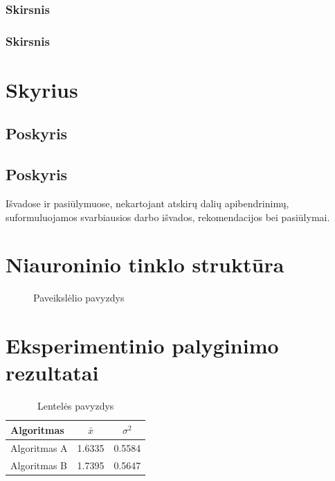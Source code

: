 \documentclass{VUMIFInfKursinis}
\begin{document}
\subsubsection{Skirsnis}
\subsubsection{Skirsnis}
\section{Skyrius}
\subsection{Poskyris}
\subsection{Poskyris}

Išvadose ir pasiūlymuose, nekartojant atskirų dalių apibendrinimų,
suformuluojamos svarbiausios darbo išvados, rekomendacijos bei pasiūlymai.

\printbibliography[heading=bibintoc] %

\appendix  %

\section{Niauroninio tinklo struktūra}
\begin{figure}[H]
    \centering
    \caption{Paveikslėlio pavyzdys}   %
    \label{img:mlp}
\end{figure}


\section{Eksperimentinio palyginimo rezultatai}
\begin{table}[H]\footnotesize
  \centering
  \caption{Lentelės pavyzdys}    %
  {\begin{tabular}{|l|c|c|} \hline
    Algoritmas & $\bar{x}$ & $\sigma^{2}$ \\
    \hline
    Algoritmas A  & 1.6335    & 0.5584       \\
    Algoritmas B  & 1.7395    & 0.5647       \\
    \hline
  \end{tabular}}
  \label{tab:table example}
\end{table}
\end{document}
